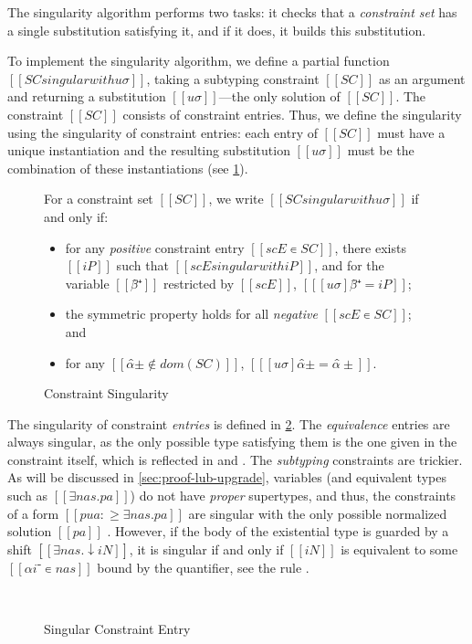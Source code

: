 The singularity algorithm 
performs two tasks: it checks that a
\emph{constraint set} has a single substitution satisfying it, 
and if it does, it builds this substitution.

To implement the singularity algorithm, we define a partial function $[[SC
singular with uσ]]$, taking a subtyping constraint $[[SC]]$ as an argument and
returning a substitution $[[uσ]]$---the only solution of $[[SC]]$. The
constraint $[[SC]]$ consists of constraint entries. Thus, we define the
singularity using the singularity of constraint entries: each entry of $[[SC]]$
must have a unique instantiation and the resulting substitution $[[uσ]]$ must be
the combination of these instantiations (see \cref{fig:constraint-singularity}).

\begin{figure}[h]
  For a constraint set $[[SC]]$, we write $[[SC singular with uσ]]$ if and only if:
  \begin{itemize}
    \item for any \emph{positive} constraint entry $[[scE ∊ SC]]$, there exists $[[iP]]$ such that $[[scE singular with iP]]$,
      and for the variable $[[β̂⁺]]$ restricted by $[[scE]]$, $[[ [uσ]β̂⁺ = iP ]]$;
    \item the symmetric property holds for all \emph{negative} $[[scE ∊ SC]]$; and
    \item for any $[[α̂± ∉ dom(SC)]]$, $[[ [uσ]α̂± = α̂± ]]$.
  \end{itemize}
  \caption{Constraint Singularity}
  \label{fig:constraint-singularity}
\end{figure}

The singularity of constraint \emph{entries} is defined in
\cref{fig:constraint-entry-singularity}. The \emph{equivalence} entries are
always singular, as the only possible type satisfying them is the one given in
the constraint itself, which is reflected in  and
. The \emph{subtyping} constraints are trickier.
As will be discussed in \cref{sec:proof-lub-upgrade}, variables 
(and equivalent types such as $[[∃nas.pa]]$) do not have 
\emph{proper} supertypes, and thus, the constraints of a form 
$[[pua :≥ ∃nas.pa]]$ are singular with the only possible normalized solution $[[pa]]$
. However, if the body of the existential type
is guarded by a shift $[[∃nas.↓iN]]$, it is singular if and only if $[[iN]]$ is
equivalent to some $[[αi⁻ ∊ {nas}]]$ bound by the quantifier, see the rule
.

\begin{figure}[h]
  \hfill\\
  \ottdefnSINGLabeled
  \caption{Singular Constraint Entry}
  \label{fig:constraint-entry-singularity}
\end{figure}

